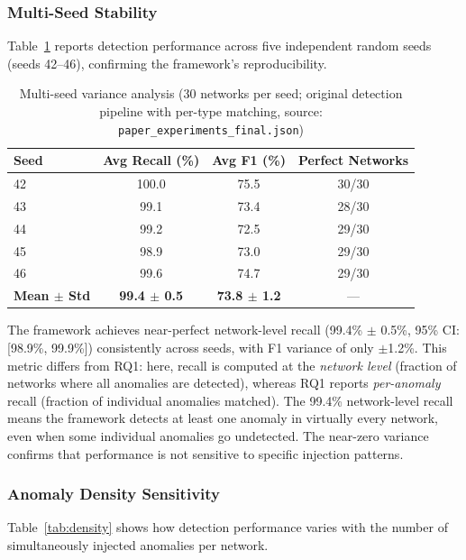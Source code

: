 \documentclass[research]{fcs}
\begin{document}
\subsubsection{Multi-Seed Stability}

Table~\ref{tab:multiseed} reports detection performance across five independent random seeds (seeds 42--46), confirming the framework's reproducibility.

\begin{table}[htbp]
\centering
\caption{Multi-seed variance analysis (30 networks per seed; original detection pipeline with per-type matching, source: \texttt{paper\_experiments\_final.json})}
\label{tab:multiseed}
\begin{tabular}{@{}lccc@{}}
\toprule
Seed & Avg Recall (\%) & Avg F1 (\%) & Perfect Networks \\
\midrule
42 & 100.0 & 75.5 & 30/30 \\
43 & 99.1 & 73.4 & 28/30 \\
44 & 99.2 & 72.5 & 29/30 \\
45 & 98.9 & 73.0 & 29/30 \\
46 & 99.6 & 74.7 & 29/30 \\
\midrule
\textbf{Mean $\pm$ Std} & \textbf{99.4 $\pm$ 0.5} & \textbf{73.8 $\pm$ 1.2} & --- \\
\bottomrule
\end{tabular}
\end{table}

The framework achieves near-perfect network-level recall (99.4\% $\pm$ 0.5\%, 95\% CI: [98.9\%, 99.9\%]) consistently across seeds, with F1 variance of only $\pm$1.2\%. This metric differs from RQ1: here, recall is computed at the \emph{network level} (fraction of networks where all anomalies are detected), whereas RQ1 reports \emph{per-anomaly} recall (fraction of individual anomalies matched). The 99.4\% network-level recall means the framework detects at least one anomaly in virtually every network, even when some individual anomalies go undetected. The near-zero variance confirms that performance is not sensitive to specific injection patterns.

\subsubsection{Anomaly Density Sensitivity}

Table~\ref{tab:density} shows how detection performance varies with the number of simultaneously injected anomalies per network.
\end{document}
